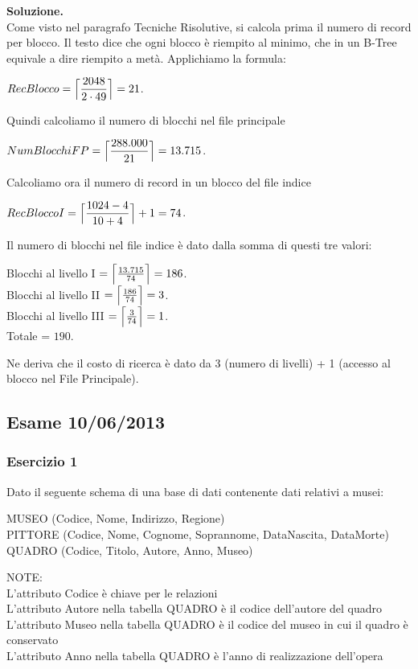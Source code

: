 \noindent\textbf{\fontsize{14pt}{1em}Soluzione.}\\
Come visto nel paragrafo Tecniche Risolutive, si calcola prima il numero di record per blocco. Il testo dice che 
ogni blocco è riempito al minimo, che in un B-Tree equivale a dire riempito a metà. Applichiamo la formula:
 \begin{center}
 $RecBlocco = \Bigl\lceil \dfrac{2048}{2\cdot 49} \Bigr\rceil = 21$.\\
\end{center}
Quindi calcoliamo il numero di blocchi nel file principale
\begin{center}
 $NumBlocchiFP = \Bigl\lceil \dfrac{288.000}{21} \Bigr\rceil = 13.715$.\\
\end{center}
Calcoliamo ora il numero di record in un blocco del file indice
\begin{center}
 $RecBloccoI = \Bigl\lceil \dfrac{1024-4}{10+4} \Bigr\rceil + 1 = 74$.\\
\end{center}
Il numero di blocchi nel file indice è dato dalla somma di questi tre valori:
\begin{center}
 Blocchi al livello I $= \Bigl\lceil \frac{13.715}{74} \Bigr\rceil = 186$.\\
 
 Blocchi al livello II $= \Bigl\lceil \frac{186}{74} \Bigr\rceil = 3$.\\
 
 Blocchi al livello III $= \Bigl\lceil \frac{3}{74} \Bigr\rceil = 1$.\\
 Totale = $190$.
\end{center}
Ne deriva che il costo di ricerca è dato da 3 (numero di livelli) + 1 (accesso al blocco nel File Principale).
\newpage
\subsection{Esame 10/06/2013}
  \subsubsection{Esercizio 1}
  Dato il seguente schema di una base di dati contenente dati relativi a musei:
  \begin{center}
  MUSEO (Codice, Nome, Indirizzo, Regione)\\
  PITTORE (Codice, Nome, Cognome, Soprannome, DataNascita, DataMorte)\\
  QUADRO (Codice, Titolo, Autore, Anno, Museo)\\
  \end{center}
  NOTE:\\
  L'attributo Codice è chiave per le relazioni\\
  L'attributo Autore nella tabella QUADRO è il codice dell'autore del quadro\\
  L'attributo Museo nella tabella QUADRO è il codice del museo in cui il quadro è conservato\\
  L'attributo Anno nella tabella QUADRO è l'anno di realizzazione dell'opera\\

